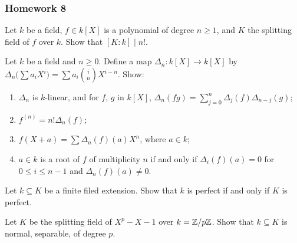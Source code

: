\subsubsection{Homework 8}
\setcounter{exercise}{0}
\setcounter{equation}{0}

\begin{problem}
  Let \(k\) be a field, \(f\in k[X]\) is a polynomial of degree
  \(n\geq 1\), and \(K\) the splitting field of \(f\) over \(k\). Show that
  \([K:k]\mid n!\).
\end{problem}
\begin{solution}
\end{solution}

\begin{problem}
  Let \(k\) be a field and \(n\geq 0\). Define a map
  \(\Delta_n\colon k[X]\to k[X]\) by
  \(\Delta_n\bigl(\sum a_iX^i\bigr)=\sum a_i\binom{i}{n}X^{i-n}\). Show:
\begin{enumerate}[label=(\alph*)]
\item \(\Delta_n\) is \(k\)-linear, and for \(f\), \(g\) in \(k[X]\),
  \(\Delta_n(fg)=\sum_{j=0}^n\Delta_j(f)\Delta_{n-j}(g)\);
\item \(f^{(n)}=n!\Delta_n(f)\);
\item \(f(X+a)=\sum\Delta_n(f)(a)X^n\), where \(a\in k\);
\item \(a\in k\) is a root of \(f\) of multiplicity \(n\) if and only if
  \(\Delta_i(f)(a)=0\) for \(0\leq i\leq n-1\) and
  \(\Delta_n(f)(a)\neq 0\).
\end{enumerate}
\end{problem}
\begin{solution}
\end{solution}

\begin{problem}
  Let \(k\subseteq K\) be a finite filed extension. Show that \(k\) is
  perfect if and only if \(K\) is perfect.
\end{problem}
\begin{solution}
\end{solution}

\begin{problem}
  Let \(K\) be the splitting field of \(X^p-X-1\) over
  \(k=\mathbb{Z}/p\mathbb{Z}\). Show that \(k\subseteq K\) is normal, separable, of
  degree \(p\).
\end{problem}
\begin{solution}
\end{solution}

